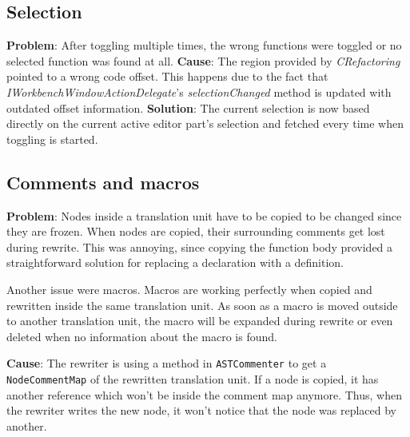 \subsection{Selection}
\textbf{Problem}: After toggling multiple times, the wrong functions were 
toggled or no selected function was found at all. 
\textbf{Cause}: The region provided by \textit{CRefactoring} pointed to a wrong 
code offset. This happens due to the fact that 
\textit{IWorkbenchWindowActionDelegate}'s \textit{selectionChanged} method is 
updated with outdated offset information.
\textbf{Solution}: The current selection is now based directly on the current 
active editor part's selection and fetched every time when toggling is started.

\subsection{Comments and macros}
\textbf{Problem}: Nodes inside a translation unit have to be copied to be 
changed since they are frozen. When nodes are copied, their surrounding comments 
get lost during rewrite\cite{Sommerlad:2008:RCR:1449814.1449817}. This was annoying, since copying the function body 
provided a straightforward solution for replacing a declaration with a 
definition.

Another issue were macros. Macros are working perfectly when copied and 
rewritten inside the same translation unit. As soon as a macro is moved outside 
to another translation unit, the macro will be expanded during rewrite or even
deleted when no information about the macro is found.

\textbf{Cause}: The rewriter is using a method in \texttt{ASTCommenter} to get a 
\texttt{NodeCommentMap} of the rewritten translation unit. If a node is copied, 
it has another reference which won't be inside the comment map anymore. Thus, 
when the rewriter writes the new node, it won't notice that the node was 
replaced by another.

